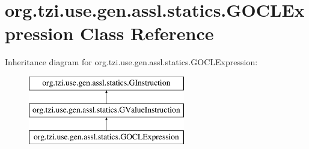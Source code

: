\hypertarget{classorg_1_1tzi_1_1use_1_1gen_1_1assl_1_1statics_1_1_g_o_c_l_expression}{\section{org.\-tzi.\-use.\-gen.\-assl.\-statics.\-G\-O\-C\-L\-Expression Class Reference}
\label{classorg_1_1tzi_1_1use_1_1gen_1_1assl_1_1statics_1_1_g_o_c_l_expression}
}
Inheritance diagram for org.\-tzi.\-use.\-gen.\-assl.\-statics.\-G\-O\-C\-L\-Expression\-:\begin{figure}[H]
\begin{center}
\leavevmode
\includegraphics[height=3.000000cm]{classorg_1_1tzi_1_1use_1_1gen_1_1assl_1_1statics_1_1_g_o_c_l_expression}
\end{center}
\end{figure}
